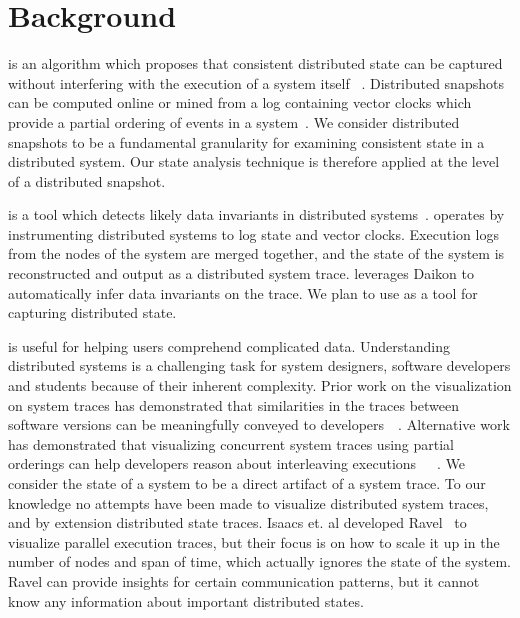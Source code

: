 \section{Background}
\label{sec:background}


 is an algorithm which
proposes that consistent distributed state can be captured without
interfering with the execution of a system itself
~\cite{dist_snapshots_Chandy1985}.  Distributed snapshots can be
computed online or mined from a log containing vector clocks which
provide a partial ordering of events in a
system~\cite{mattern_vector_clocks_1989}. We consider distributed
snapshots to be a fundamental granularity for examining consistent
state in a distributed system. Our state analysis technique is therefore applied at the level
of a distributed snapshot.

\noindent{\textbf{\dinv}} is a tool which detects likely data invariants in distributed
systems~\cite{dinv}. \dinv operates by instrumenting distributed
systems to log state and vector clocks. Execution logs from the nodes
of the system are merged together, and the state of the system is
reconstructed and output as a distributed system trace. \dinv
leverages Daikon to automatically infer data invariants on the trace.
We plan to use \dinv as a tool for capturing distributed state.

 is useful for helping users
comprehend complicated data.  Understanding distributed systems is a
challenging task for system designers, software developers and
students because of their inherent complexity.  Prior work on the
visualization on system traces has demonstrated that similarities in
the traces between software versions can be meaningfully conveyed to
developers~\cite{6613833}~\cite{Reynolds_detectingthe}. Alternative work has demonstrated that
visualizing concurrent system traces using partial orderings can help
developers reason about interleaving
executions~\cite{6650534}~\cite{7272586}~\cite{isaacs2014combing}. 
We consider the state of a
system to be a direct artifact of a system trace. To our knowledge no
attempts have been made to visualize distributed system traces, and by
extension distributed state traces.  Isaacs et. al developed Ravel~\cite{isaacs2014combing}
to visualize parallel execution traces, but their focus is on how to 
scale it up in the number of nodes and span of time, which actually
ignores the state of the system.  Ravel can provide insights for 
certain communication patterns, but it cannot know any information
about important distributed states.


